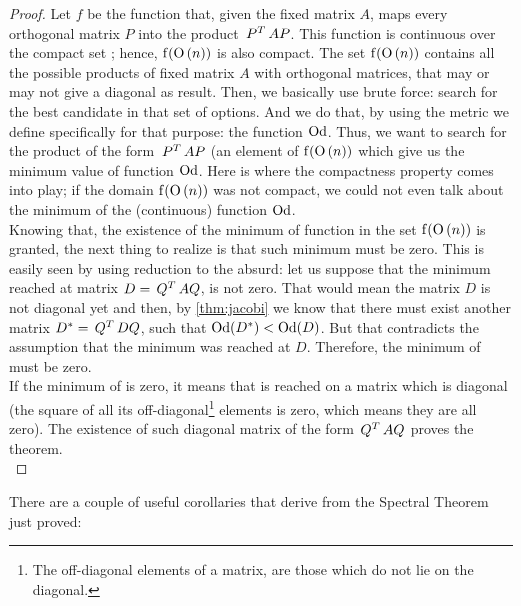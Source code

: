 \begin{proof}
Let $f$ be the function that, given the fixed matrix $A$, maps every
orthogonal matrix $P$ into the product $\,{P}^{T}\,AP$. This function is
continuous over the compact set ; hence, $\operatorname{f}(\operatorname{O}\left(n\right))$ is also
compact. The set $\operatorname{f}(\operatorname{O}\left(n\right))$ contains all the possible products of
fixed matrix $A$ with orthogonal matrices, that may or may not give a diagonal
 as result. Then, we basically use brute force: search for the best
candidate in that set of options. And we do that, by using the metric
we define specifically for that purpose: the function
$\operatorname{Od}$. Thus, we want to search for the product of the form
$\,{P}^{T}\,AP$ (an element of $\operatorname{f}(\operatorname{O}\left(n\right))$ which give us the
minimum value of function $\operatorname{Od}$. Here is where the compactness
property comes into play; if the domain $\operatorname{f}(\operatorname{O}\left(n\right))$ was not compact, we could
not even talk about the minimum of the (continuous) function
$\operatorname{Od}$. \\

Knowing that, the existence of the minimum of function  in the
set $\operatorname{f}(\operatorname{O}\left(n\right))$ is granted, the next thing to realize is that
such minimum must be zero. This is easily seen by using reduction to
the absurd: let us suppose that the minimum reached at matrix
$D = \,{Q}^{T}\,AQ$, is not zero. That would mean the matrix $D$ is not
diagonal yet and then, by \cref{thm:jacobi} we know that there
must exist another matrix $D^{*} = \,{Q}^{T}\,DQ$, such that
$\operatorname{Od}(D^{*}) < \operatorname{Od}(D)$. But that contradicts the assumption
that the minimum was reached at $D$. Therefore, the minimum of
 must be zero. \\

If the minimum of  is zero, it means that is reached on a
matrix which is diagonal (the square of all its
off-diagonal\footnote{The off-diagonal elements of a matrix, are those
which do not lie on the diagonal.} elements is zero, which means they
are all zero).  The existence of such diagonal matrix of the form
$\,{Q}^{T}\,AQ$ proves the theorem. \\
\end{proof}
\hfill

There are a couple of useful corollaries that derive from the Spectral
Theorem just proved: \\

